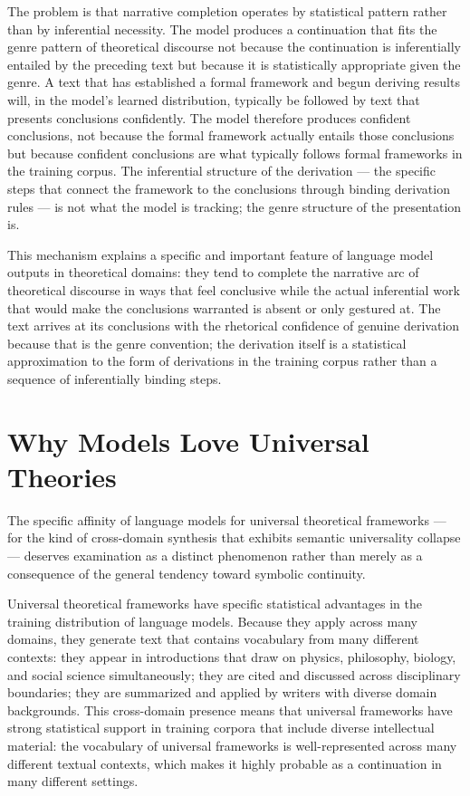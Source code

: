 \documentclass[12pt, openright, twoside]{book}
\begin{document}
The problem is that narrative completion operates by
statistical pattern rather than by inferential necessity.
The model produces a continuation that fits the genre
pattern of theoretical discourse not because the
continuation is inferentially entailed by the preceding
text but because it is statistically appropriate given
the genre. A text that has established a formal framework
and begun deriving results will, in the model's learned
distribution, typically be followed by text that
presents conclusions confidently. The model therefore
produces confident conclusions, not because the
formal framework actually entails those conclusions
but because confident conclusions are what typically
follows formal frameworks in the training corpus.
The inferential structure of the derivation --- the
specific steps that connect the framework to the
conclusions through binding derivation rules --- is
not what the model is tracking; the genre structure
of the presentation is.

This mechanism explains a specific and important feature
of language model outputs in theoretical domains:
they tend to complete the narrative arc of theoretical
discourse in ways that feel conclusive while the actual
inferential work that would make the conclusions
warranted is absent or only gestured at. The text
arrives at its conclusions with the rhetorical
confidence of genuine derivation because that is the
genre convention; the derivation itself is a
statistical approximation to the form of derivations
in the training corpus rather than a sequence of
inferentially binding steps.

\section{Why Models Love Universal Theories}

The specific affinity of language models for universal
theoretical frameworks --- for the kind of cross-domain
synthesis that exhibits semantic universality collapse ---
deserves examination as a distinct phenomenon rather
than merely as a consequence of the general tendency
toward symbolic continuity.

Universal theoretical frameworks have specific
statistical advantages in the training distribution
of language models. Because they apply across many
domains, they generate text that contains vocabulary
from many different contexts: they appear in introductions
that draw on physics, philosophy, biology, and social
science simultaneously; they are cited and discussed
across disciplinary boundaries; they are summarized
and applied by writers with diverse domain backgrounds.
This cross-domain presence means that universal frameworks
have strong statistical support in training corpora
that include diverse intellectual material: the
vocabulary of universal frameworks is well-represented
across many different textual contexts, which makes
it highly probable as a continuation in many different
settings.
\end{document}
